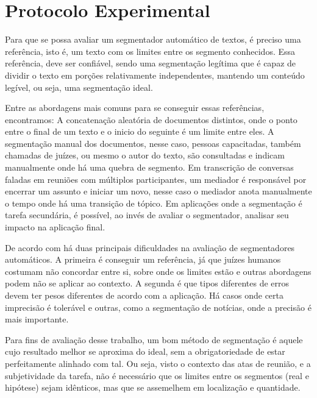 
\section{Protocolo Experimental}
	\label{sec:protocolo-experimental}



Para que se possa avaliar um segmentador automático de textos, é preciso uma referência, isto é, um texto com os limites entre os segmento conhecidos. Essa referência, deve ser confiável, sendo uma segmentação legítima que é capaz de dividir o texto em porções relativamente independentes, mantendo um conteúdo legível, ou seja, uma segmentação ideal.
%

Entre as abordagens mais comuns para se conseguir essas referências, encontramos: A concatenação aleatória de documentos distintos, onde o ponto entre o final de um texto e o inicio do seguinte é um limite entre eles. A segmentação manual dos documentos, nesse caso, pessoas capacitadas, também chamadas de juízes, ou mesmo o autor do texto, são consultadas e indicam manualmente onde há uma quebra de segmento. Em transcrição de conversas faladas em reuniões com múltiplos participantes, um mediador é responsável por encerrar um assunto e iniciar um novo, nesse caso o mediador anota manualmente o tempo onde há uma transição de tópico. Em aplicações onde a segmentação é tarefa secundária, é possível, ao invés de avaliar o segmentador, analisar seu impacto na aplicação final.


De acordo com \cite{Pevzner2002} há duas principais dificuldades na avaliação de segmentadores automáticos. A primeira é conseguir um referência, já que juízes humanos costumam não concordar entre si, sobre onde os limites estão e outras abordagens podem não se aplicar ao contexto. A segunda é que tipos diferentes de erros devem ter pesos diferentes de acordo com a aplicação. Há casos onde certa imprecisão é tolerável e outras, como a segmentação de notícias, onde a precisão é mais importante.


Para fins de avaliação desse trabalho, um bom método de segmentação é aquele cujo resultado melhor se aproxima do ideal, sem a obrigatoriedade de estar perfeitamente alinhado com tal. Ou seja, visto o contexto das atas de reunião, e a subjetividade da tarefa, não é necessário que os limites entre os segmentos (real e hipótese) sejam idênticos, mas que se assemelhem em localização e quantidade.


